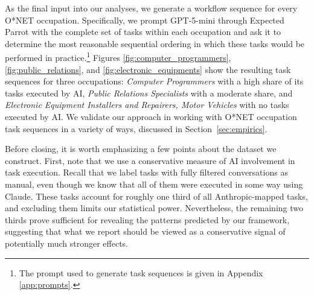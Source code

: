 As the final input into our analyses, we generate a workflow sequence for every O*NET occupation. 
Specifically, we prompt GPT-5-mini through Expected Parrot \citep{Horton2024EDSL} with the complete set of tasks within each occupation and ask it to determine the most reasonable sequential ordering in which these tasks would be performed in practice.\footnote{The prompt used to generate task sequences is given in Appendix \ref{app:prompts}.
}
Figures \ref{fig:computer_programmers}, \ref{fig:public_relations}, and \ref{fig:electronic_equipments} show the resulting task sequences for three occupations: \textit{Computer Programmers} with a high share of its tasks executed by AI, \textit{Public Relations Specialists} with a moderate share, and \textit{Electronic Equipment Installers and Repairers, Motor Vehicles} with no tasks executed by AI.
We validate our approach in working with O*NET occupation task sequences in a variety of ways, discussed in Section~\ref{sec:empirics}.

Before closing, it is worth emphasizing a few points about the dataset we construct.
First, note that we use a conservative measure of AI involvement in task execution.
Recall that we label tasks with fully filtered conversations as manual, even though we know that all of them were executed in some way using Claude.
These tasks account for roughly one third of all Anthropic-mapped tasks, and excluding them limits our statistical power.
Nevertheless, the remaining two thirds prove sufficient for revealing the patterns predicted by our framework, suggesting that what we report should be viewed as a conservative signal of potentially much stronger effects.

